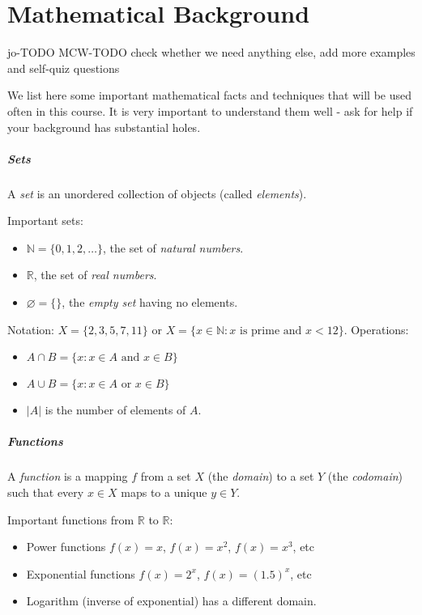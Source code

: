 \chapter{Mathematical Background}
\label{ch:app:mathtools}

jo-TODO
MCW-TODO check whether we need anything else, add more examples and self-quiz questions

We list here some important mathematical facts and techniques  that will be used often in this course. It is very important to understand them well - ask for help if your background has substantial holes.

\paragraph{Sets}

A \emph{set} is an unordered collection of objects (called \emph{elements}).

Important sets: 
\begin{itemize}
\item $\mathbb{N} = \{0,1,2,\dots \}$, the set of \emph{natural numbers}.
\item $\mathbb{R}$, the set of \emph{real numbers}.
\item $\varnothing = \{\}$, the \emph{empty set} having no elements.
\end{itemize}

Notation: $X = \{2,3,5,7,11\}$ or $X = \{x\in \mathbb{N} : \text{$x$ is prime and $x< 12$}\}$.
Operations: 
\begin{itemize}
\item $A\cap B = \{x: x\in A \text{ and } x\in B\}$
\item $A\cup B = \{x: x\in A \text{ or  } x\in B\}$
\item $|A|$ is the number of elements of $A$.
\end{itemize}


\paragraph{Functions}

A \emph{function} is a mapping $f$ from a set $X$ (the \emph{domain}) to a set $Y$ (the \emph{codomain}) such that every $x\in X$ maps to a unique $y\in Y$.

Important functions from $\mathbb{R}$ to $\mathbb{R}$: 
\begin{itemize}
\item Power functions $f(x) = x$, $f(x) = x^2$, $f(x) = x^3$, etc
\item Exponential functions $f(x) = 2^x$, $f(x) = (1.5)^x$, etc
\item Logarithm (inverse of exponential) has a different domain.
\end{itemize}


